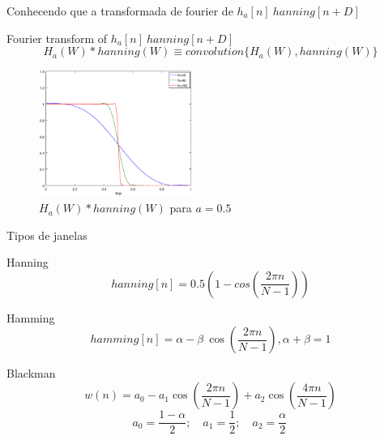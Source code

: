\documentclass[envcountsect,dvips]{beamer}
\begin{document}
\begin{frame}{Conhecendo que a transformada de fourier de $h_a[n]~hanning[n+D]$}
\begin{block}{Fourier transform of $h_a[n]~hanning[n+D]$}
 \begin{equation}
  H_a(W)*hanning(W) \equiv convolution\{H_a(W),hanning(W)\}
 \end{equation}
\end{block}
\begin{figure}[!htb]
\centering
\includegraphics[width=5cm]{images/XW5h.eps}
\caption{$H_a(W)*hanning(W)$ para $a=0.5$}
\label{fig:XW5h}
\end{figure}  
\end{frame}


\begin{frame}{Tipos de janelas }

\begin{block}{Hanning}
 \begin{equation}
  hanning[n]=0.5(1-cos(\frac{2 \pi n }{N-1}))
 \end{equation}
\end{block}
 
\begin{block}{Hamming}
 \begin{equation}
  hamming[n]= \alpha - \beta\ \cos\left( \frac{2 \pi n}{N - 1} \right), \alpha+\beta=1
 \end{equation}
\end{block}

\begin{block}{Blackman}
\begin{equation}
    w(n)=a_0 - a_1 \cos \left ( \frac{2 \pi n}{N-1} \right) + a_2 \cos \left ( \frac{4 \pi n}{N-1} \right)
\end{equation}
\begin{equation}
    a_0=\frac{1-\alpha}{2};\quad a_1=\frac{1}{2};\quad a_2=\frac{\alpha}{2}\, 
\end{equation}
\end{block}

\end{frame}
\end{document}
